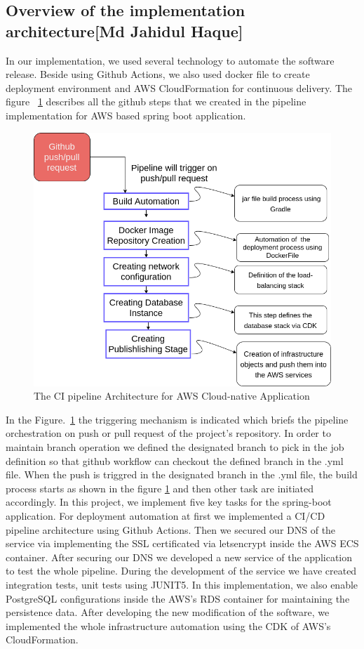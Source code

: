 \subsection{Overview of the implementation architecture[Md Jahidul Haque]}\label{sec:arch-aws}

In our implementation, we used several technology to automate the software release. Beside using Github Actions, we also used docker file to create deployment environment and AWS CloudFormation for continuous delivery. The figure ~\ref{fig:ci-cd} describes all the github steps that we created in the pipeline implementation for AWS based spring boot application.

\begin{figure}[h]
\includegraphics[scale=0.60]{images/jahidul/arch_ci_cd.png}
\centering
\caption{The {{CI\CD}} pipeline Architecture for AWS Cloud-native Application}
\label{fig:ci-cd}
\end{figure}

In the Figure.~\ref{fig:ci-cd} the triggering mechanism is indicated which briefs the pipeline orchestration on push or pull request of the project's repository. In order to maintain branch operation we defined the designated branch to pick in the job definition so that github workflow can checkout the defined branch in the {{.yml}} file. When the push is triggred in the designated branch in the {{.yml}} file, the build process starts as shown in the figure \ref{fig:ci-cd} and then other task are initiated accordingly. In this project, we implement five key tasks for the spring-boot application. For deployment automation at first we implemented a CI/CD pipeline architecture using Github Actions. Then we secured our DNS of the service via implementing the SSL certificated via letsencrypt inside the AWS ECS container. After securing our DNS we developed a new service of the application to test the whole pipeline. During the development of the service we have created integration tests, unit tests using JUNIT5. In this implementation, we also enable PostgreSQL configurations inside the AWS's RDS container for maintaining the persistence data. After developing the new modification of the software, we implemented the whole infrastructure automation using the CDK of AWS's CloudFormation.